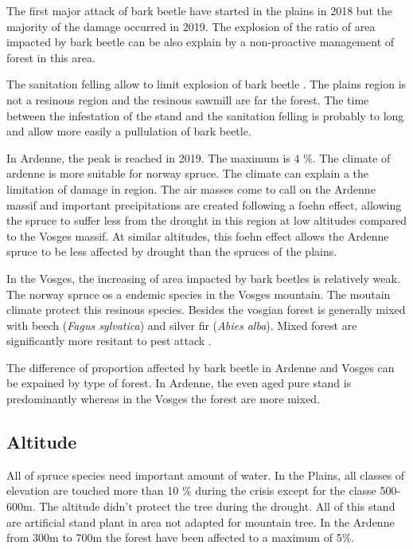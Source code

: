 \documentclass[3p,procedia]{elsarticle}
\begin{document}
The first major attack of bark beetle have started in the plains in 2018 but the majority of the damage occurred in 2019. 
The explosion of the ratio of area impacted by bark beetle can be also explain by a non-proactive management of forest in this area.

The sanitation felling allow to limit explosion of bark beetle \citep{stadelmann_effects_2013}.
The plains region is not a resinous region and the resinous sawmill are far the forest. 
The time between the infestation of the stand and the sanitation felling is probably to long and allow more easily a pullulation of bark beetle.

In Ardenne, the peak is reached in 2019. The maximum is 4 \%. The climate of ardenne is more suitable for norway spruce. 
The climate can explain a the limitation of damage in region. 
The air masses come to call on the Ardenne massif and important precipitations are created following a foehn effect, allowing the spruce to suffer less from the drought in this region at low altitudes compared to the Vosges massif. 
At similar altitudes, this foehn effect allows the Ardenne spruce to be less affected by drought than the spruces of the plains.

In the Vosges, the increasing of area impacted by bark beetles is relatively weak.
The norway spruce os a endemic species in the Vosges mountain. 
The moutain climate protect this resinous species. 
Besides the vosgian forest is generally mixed with beech (\textit{Fagus sylvatica}) and  silver fir (\textit{Abies alba}). Mixed forest are significantly more resitant to pest attack \citep{jactel_2021}. 

The difference of proportion affected by bark beetle in Ardenne and Vosges can be expained by type of forest.
In Ardenne, the even aged pure stand is predominantly whereas in the Vosges  the forest are more mixed. 

\subsection{Altitude}

All of spruce species need important amount of water. 
In the Plains, all classes of elevation are touched more than 10 \% during the crisis except for the classe 500-600m. 
The altitude didn't protect the tree during the drought. 
All of this stand are artificial stand plant in area not adapted for mountain tree. In the Ardenne from 300m to 700m the forest have been affected to a maximum of 5\%. 
\end{document}
